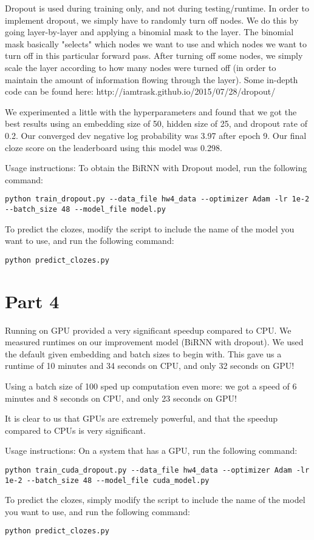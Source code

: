 \documentclass{article}
\begin{document}
Dropout is used during training only, and not during testing/runtime. In order to implement dropout, we simply have to randomly turn off nodes. We do this by going layer-by-layer and applying a binomial mask to the layer. The binomial mask basically "selects" which nodes we want to use and which nodes we want to turn off in this particular forward pass. After turning off some nodes, we simply scale the layer according to how many nodes were turned off (in order to maintain the amount of information flowing through the layer). Some in-depth code can be found here: http://iamtrask.github.io/2015/07/28/dropout/

We experimented a little with the hyperparameters and found that we got the best results using an embedding size of 50, hidden size of 25, and dropout rate of 0.2. Our converged dev negative log probability was 3.97 after epoch 9. Our final cloze score on the leaderboard using this model was 0.298. 

Usage instructions:
To obtain the BiRNN with Dropout model, run the following command:
\begin{verbatim}
python train_dropout.py --data_file hw4_data --optimizer Adam -lr 1e-2 --batch_size 48 --model_file model.py
\end{verbatim}
To predict the clozes, modify the script to include the name of the model you want to use, and run the following command:
\begin{verbatim}
python predict_clozes.py
\end{verbatim}

\section{Part 4}

Running on GPU provided a very significant speedup compared to CPU. We measured runtimes on our improvement model (BiRNN with dropout). We used the default given embedding and batch sizes to begin with. This gave us a runtime of 10 minutes and 34 seconds on CPU, and only 32 seconds on GPU!

Using a batch size of 100 sped up computation even more: we got a speed of 6 minutes and 8 seconds on CPU, and only 23 seconds on GPU!

It is clear to us that GPUs are extremely powerful, and that the speedup compared to CPUs is very significant.

Usage instructions:
On a system that has a GPU, run the following command:
\begin{verbatim}
python train_cuda_dropout.py --data_file hw4_data --optimizer Adam -lr 1e-2 --batch_size 48 --model_file cuda_model.py
\end{verbatim}
To predict the clozes, simply modify the script to include the name of the model you want to use, and run the following command:
\begin{verbatim}
python predict_clozes.py
\end{verbatim}
\end{document}
